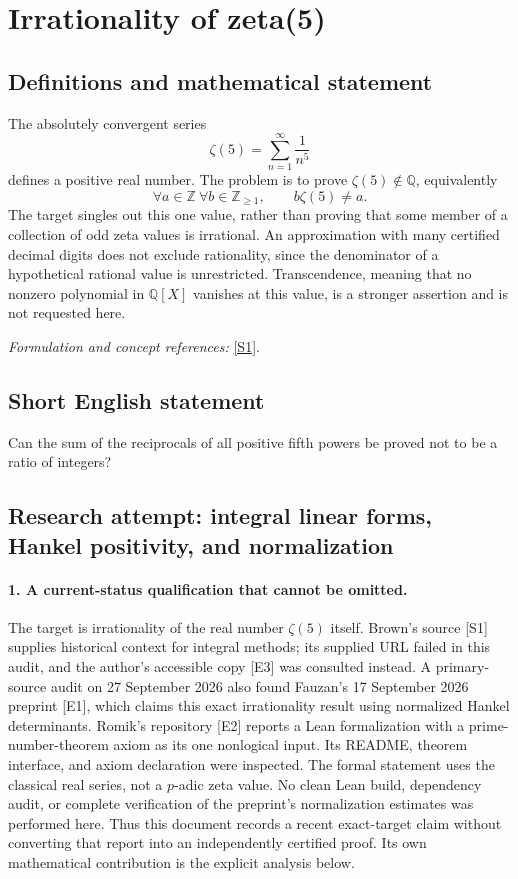 \documentclass[11pt]{article}
\begin{document}
\section*{\texorpdfstring{Irrationality of zeta(5)}{Irrationality of zeta(5)}}\label{30006861}
\subsection{Definitions and mathematical statement}
The absolutely convergent series
\[
 \zeta(5)=\sum_{n=1}^{\infty}\frac1{n^5}
\]
defines a positive real number. The problem is to prove $\zeta(5)\notin{\mathbb{Q}}$, equivalently
\[
 \forall a\in{\mathbb{Z}}\ \forall b\in{\mathbb{Z}}_{\ge1},\qquad b\zeta(5)\ne a.
\]
The target singles out this one value, rather than proving that some member of a collection of odd zeta values is irrational. An approximation with many certified decimal digits does not exclude rationality, since the denominator of a hypothetical rational value is unrestricted. Transcendence, meaning that no nonzero polynomial in ${\mathbb{Q}}[X]$ vanishes at this value, is a stronger assertion and is not requested here.
\par\smallskip\textit{Formulation and concept references:} \href{https://www2.mathematik.hu-berlin.de/~kreimer/wp-content/uploads/IrratModuliMotivesv8.pdf}{[S1]}.

\subsection{Short English statement}
Can the sum of the reciprocals of all positive fifth powers be proved not to be a ratio of integers?
\subsection{Research attempt: integral linear forms, Hankel positivity, and normalization}
\paragraph{1. A current-status qualification that cannot be omitted.}
The target is irrationality of the real number $\zeta(5)$ itself. Brown's source [S1] supplies historical context for integral methods; its supplied URL failed in this audit, and the author's accessible copy [E3] was consulted instead. A primary-source audit on 27 September 2026 also found Fauzan's 17 September 2026 preprint [E1], which claims this exact irrationality result using normalized Hankel determinants. Romik's repository [E2] reports a Lean formalization with a prime-number-theorem axiom as its one nonlogical input. Its README, theorem interface, and axiom declaration were inspected. The formal statement uses the classical real series, not a $p$-adic zeta value. No clean Lean build, dependency audit, or complete verification of the preprint's normalization estimates was performed here. Thus this document records a recent exact-target claim without converting that report into an independently certified proof. Its own mathematical contribution is the explicit analysis below.
\end{document}
